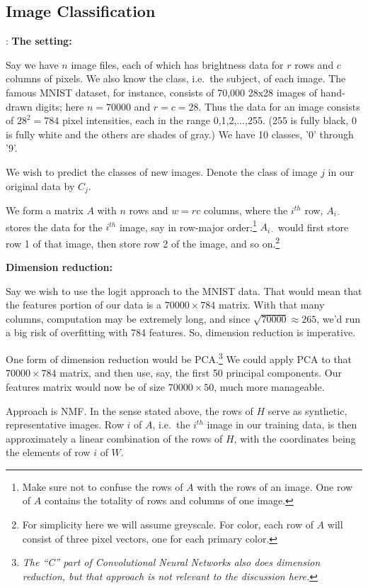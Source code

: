 \subsection{Image Classification}
:
\textbf{The setting:}

Say we have $n$ image files, each of which has brightness data for $r$
rows and $c$ columns of pixels.  We also know the class, i.e.\ the
subject, of each image.  The famous MNIST dataset, for instance,
consists of 70,000 28x28 images of hand-drawn digits; here $n = 70000$
and $r = c = 28$.  Thus the data for an image consists of $28^2 = 784$
pixel intensities, each in the range 0,1,2,...,255.  (255 is fully
black, 0 is fully white and the others are shades of gray.) We have 10
classes, '0' through '9'.

We wish to predict the classes of new images. Denote the class of
image $j$ in our original data by $C_j$.

We form a matrix $A$ with $n$ rows and $w = rc$ columns, where the
$i^{th}$ row, $A_{i \cdot}$ stores the data for the $i^{th}$ image, say
in row-major order:\footnote{Make sure not to confuse the rows of $A$
with the rows of an image.  One row of $A$ contains the totality of rows
and columns of one image.} $A_{i \cdot}$ would first store row 1 of
that image, then store row 2 of the image, and so on.\footnote{For
simplicity here we will assume greyscale.  For color, each row of $A$
will consist of three pixel vectors, one for each primary color.}

\textbf{Dimension reduction:}

Say we wish to use the logit approach to the MNIST data.  That would
mean that the features portion of our data is a $70000 \times 784$
matrix.  With that many columns, computation may be extremely long, and
since $\sqrt{70000} \approx 265$, we'd run a big risk of overfitting
with 784 features.  So, dimension reduction is imperative.

One form of dimension reduction would be PCA.\footnote{\textit{The ``C''
part of \textit{Convolutional Neural Networks} also does dimension
reduction, but that approach is not relevant to the discussion here.}}
We could apply PCA to that $70000 \times 784$ matrix, and then use, say,
the first 50 principal components.  Our features matrix would now be of
size $70000 \times 50$, much more manageable.

Approach is NMF.  In the sense stated above, the rows of $H$ serve as synthetic,
representative images.  Row $i$ of $A$, i.e.\ the $i^{th}$ image in our
training data, is then approximately a linear combination of the rows of
$H$, with the coordinates being the elements of row $i$ of $W$.


